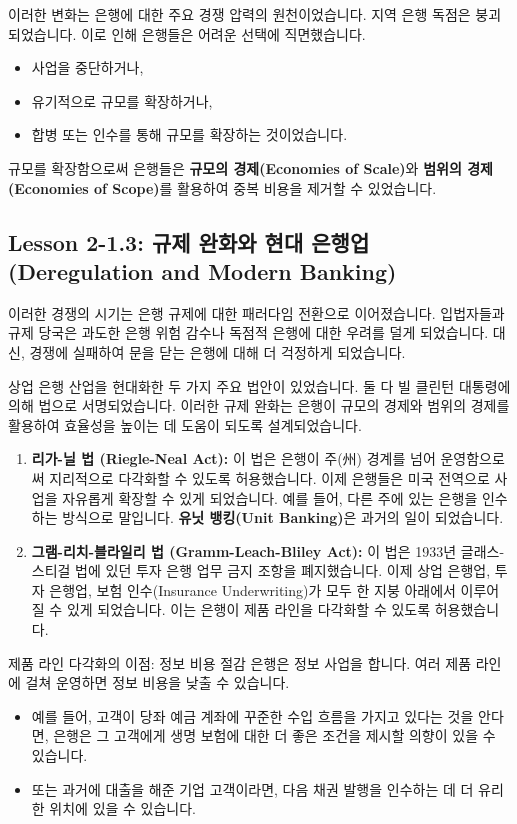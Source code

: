 \documentclass[11pt,a4paper]{article}
\theoremstyle{definition}
\begin{document}
이러한 변화는 은행에 대한 주요 경쟁 압력의 원천이었습니다. 지역 은행 독점은 붕괴되었습니다. 이로 인해 은행들은 어려운 선택에 직면했습니다.
\begin{itemize}
    \item 사업을 중단하거나,
    \item 유기적으로 규모를 확장하거나,
    \item 합병 또는 인수를 통해 규모를 확장하는 것이었습니다.
\end{itemize}
규모를 확장함으로써 은행들은 \textbf{규모의 경제(Economies of Scale)}와 \textbf{범위의 경제(Economies of Scope)}를 활용하여 중복 비용을 제거할 수 있었습니다.

\newpage
\subsection{Lesson 2-1.3: 규제 완화와 현대 은행업 (Deregulation and Modern Banking)}

이러한 경쟁의 시기는 은행 규제에 대한 패러다임 전환으로 이어졌습니다. 입법자들과 규제 당국은 과도한 은행 위험 감수나 독점적 은행에 대한 우려를 덜게 되었습니다. 대신, 경쟁에 실패하여 문을 닫는 은행에 대해 더 걱정하게 되었습니다.

상업 은행 산업을 현대화한 두 가지 주요 법안이 있었습니다. 둘 다 빌 클린턴 대통령에 의해 법으로 서명되었습니다. 이러한 규제 완화는 은행이 규모의 경제와 범위의 경제를 활용하여 효율성을 높이는 데 도움이 되도록 설계되었습니다.

\begin{enumerate}
    \item \textbf{리가-닐 법 (Riegle-Neal Act):}
    이 법은 은행이 주(州) 경계를 넘어 운영함으로써 지리적으로 다각화할 수 있도록 허용했습니다. 이제 은행들은 미국 전역으로 사업을 자유롭게 확장할 수 있게 되었습니다. 예를 들어, 다른 주에 있는 은행을 인수하는 방식으로 말입니다. \textbf{유닛 뱅킹(Unit Banking)}은 과거의 일이 되었습니다.

    \item \textbf{그램-리치-블라일리 법 (Gramm-Leach-Bliley Act):}
    이 법은 1933년 글래스-스티걸 법에 있던 투자 은행 업무 금지 조항을 폐지했습니다. 이제 상업 은행업, 투자 은행업, 보험 인수(Insurance Underwriting)가 모두 한 지붕 아래에서 이루어질 수 있게 되었습니다. 이는 은행이 제품 라인을 다각화할 수 있도록 허용했습니다.
\end{enumerate}

\begin{examplebox}{제품 라인 다각화의 이점: 정보 비용 절감}
은행은 정보 사업을 합니다. 여러 제품 라인에 걸쳐 운영하면 정보 비용을 낮출 수 있습니다.
\begin{itemize}
    \item 예를 들어, 고객이 당좌 예금 계좌에 꾸준한 수입 흐름을 가지고 있다는 것을 안다면, 은행은 그 고객에게 생명 보험에 대한 더 좋은 조건을 제시할 의향이 있을 수 있습니다.
    \item 또는 과거에 대출을 해준 기업 고객이라면, 다음 채권 발행을 인수하는 데 더 유리한 위치에 있을 수 있습니다.
\end{itemize}
\end{examplebox}
\end{document}

